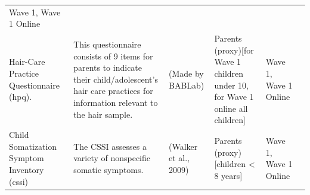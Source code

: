 \documentclass[
]{book}
\begin{document}
\begin{longtable}[]{@{}llllll@{}}
\begin{minipage}[t]{0.06\columnwidth}
Wave 1, Wave 1 Online\strut
\end{minipage} & \begin{minipage}[t]{0.10\columnwidth}\raggedright
\strut
\end{minipage}\tabularnewline
\begin{minipage}[t]{0.18\columnwidth}\raggedright
Hair-Care Practice Questionnaire (hpq).\strut
\end{minipage} & \begin{minipage}[t]{0.18\columnwidth}\raggedright
This questionnaire consists of 9 items for parents to indicate their child/adolescent's hair care practices for information relevant to the hair sample.\strut
\end{minipage} & \begin{minipage}[t]{0.15\columnwidth}\raggedright
(Made by BABLab)\strut
\end{minipage} & \begin{minipage}[t]{0.16\columnwidth}\raggedright
Parents (proxy){[}for Wave 1 children under 10, for Wave 1 online all children{]}\strut
\end{minipage} & \begin{minipage}[t]{0.06\columnwidth}\raggedright
Wave 1, Wave 1 Online\strut
\end{minipage} & \begin{minipage}[t]{0.10\columnwidth}\raggedright
\strut
\end{minipage}\tabularnewline
\begin{minipage}[t]{0.18\columnwidth}\raggedright
Child Somatization Symptom Inventory (cssi)\strut
\end{minipage} & \begin{minipage}[t]{0.18\columnwidth}\raggedright
The CSSI assesses a variety of nonspecific somatic symptoms.\strut
\end{minipage} & \begin{minipage}[t]{0.15\columnwidth}\raggedright
(Walker et al., 2009)\strut
\end{minipage} & \begin{minipage}[t]{0.16\columnwidth}\raggedright
Parents (proxy){[}children \textless{} 8 years{]}\strut
\end{minipage} & \begin{minipage}[t]{0.06\columnwidth}\raggedright
Wave 1, Wave 1 Online\strut
\end{minipage} & \begin{minipage}[t]{0.10\columnwidth}\raggedright
\strut
\end{minipage}\tabularnewline

\end{longtable}
\end{document}
